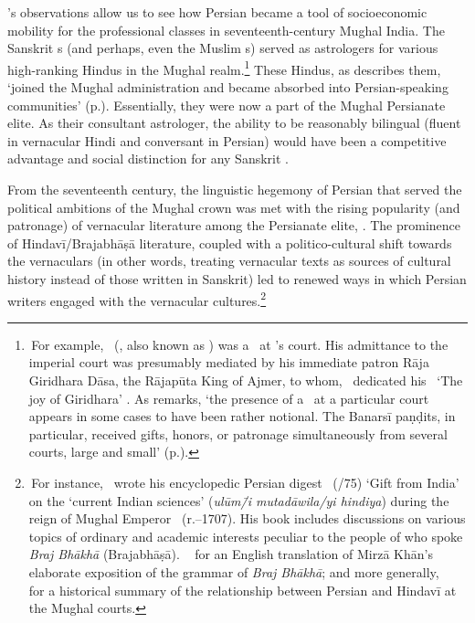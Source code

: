 \citeauthor{AlamPersian1998}'s observations allow us to see how Persian became a tool of socioeconomic mobility for the professional classes in seventeenth-century Mughal India. The Sanskrit \jyotisa s (and perhaps, even the Muslim \munajjim s) served as astrologers for various high-ranking Hindus in the Mughal realm.\footnote{\,For example, \VedangarayaMalajit\ (, also known as \Srimalaji) was a \jyotisa\ at \Shahjahan's court. His admittance to the imperial court was presumably mediated by his immediate patron Rāja Giridhara Dāsa, the Rājapūta King of Ajmer, to whom, \Srimalaji\ dedicated his \Giridharananda\ `The joy of Giridhara' \parencite[121--122]{Minkowskilearnedbrahmin}. As \citeauthor{Minkowskilearnedbrahmin} remarks, `the presence of a \jyotisa\ at a particular court appears in some cases to have been rather notional. The Banarsī paṇḍits, in particular, received gifts, honors, or patronage simultaneously from several courts, large and small' (p.).\label{srimalaji_footnote}} These Hindus, as \textcite{Truschke} describes them, `joined the Mughal administration and became absorbed into Persian-speaking communities' (p.). Essentially, they were now a part of the Mughal Persianate elite. As their consultant astrologer, the ability to be reasonably bilingual (fluent in vernacular Hindi and conversant in Persian) would have been a competitive advantage and social distinction for any Sanskrit \jyotisa.

From the seventeenth century, the linguistic hegemony of Persian that served the political ambitions of the Mughal crown was met with the rising popularity (and patronage) of vernacular literature among the Persianate elite, \parencite[\eg \vid][chapters~3--4]{AllisonHindiPoetry}. The prominence of Hindavī/Brajabhāṣā literature, coupled with a politico-cultural shift towards the vernaculars (in other words, treating vernacular texts as sources of cultural history instead of those written in Sanskrit) led to renewed ways in which Persian writers engaged with the vernacular cultures.\footnote{\,For instance, \MirzaKhanbFakhralDinMuhammad\ wrote his encyclopedic Persian digest \TuhfatalHind\ (/75) `Gift from India' on the `current Indian sciences' (\Ayn \textit{ulūm\=/i mutadāwila\-/yi hindiya}) during the reign of Mughal Emperor \Awrangzeb\ (r.--1707). His book includes discussions on various topics of ordinary and academic interests peculiar to the people of who spoke \textit{Braj Bhākhā} (Brajabhāṣā). \Vid\ \textcite{Ziauddin} for an English translation of Mirzā Khān's elaborate exposition of the grammar of \textit{Braj Bhākhā}; and more generally, \vid\ \textcite[342--348]{AlamPersian1998} for a historical summary of the relationship between Persian and Hindavī at the Mughal courts.} 

